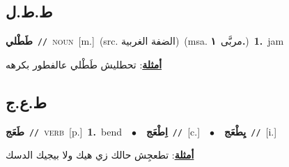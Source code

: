 \documentclass[10pt,a4paper,twoside]{article} %
\begin{document}
\begin{multicols}{2}
\vspace{-3mm}
\subsection*{\color{blue}\foreignlanguage{arabic}{ط.ط.ل}\color{blue}{ (ntws)}} 

{\setlength\topsep{0pt}\textbf{\foreignlanguage{arabic}{طَطْلي}}\ {\color{gray}\texttt{//}\color{black}}\ \textsc{noun}\ [m.]\ (src. \color{gray}\foreignlanguage{arabic}{الضفة الغربية}\color{black})\ \color{gray}(msa. \foreignlanguage{arabic}{مربَّى}~\foreignlanguage{arabic}{\textbf{١.}})\color{black}\ \textbf{1.}~jam\  \begin{flushright}\color{gray}\foreignlanguage{arabic}{\textbf{\underline{\foreignlanguage{arabic}{أمثلة}}}: تحطليش طَطْلي عالفطور بكرهه}\end{flushright}\color{black}} \vspace{2mm}

\vspace{-3mm}
\subsection*{\color{blue}\foreignlanguage{arabic}{ط.ع.ج}\color{blue}{}} 

{\setlength\topsep{0pt}\textbf{\foreignlanguage{arabic}{طَعَج}}\ {\color{gray}\texttt{//}\color{black}}\ \textsc{verb}\ [p.]\ \textbf{1.}~bend\ \ $\bullet$\ \ \setlength\topsep{0pt}\textbf{\foreignlanguage{arabic}{اِطْعَج}}\ {\color{gray}\texttt{//}\color{black}}\ [c.]\ \ $\bullet$\ \ \setlength\topsep{0pt}\textbf{\foreignlanguage{arabic}{يِطْعَج}}\ {\color{gray}\texttt{//}\color{black}}\ [i.]\  \begin{flushright}\color{gray}\foreignlanguage{arabic}{\textbf{\underline{\foreignlanguage{arabic}{أمثلة}}}: تطعجِش حالك زي هيك ولا بيجيك الدسك}\end{flushright}\color{black}} \vspace{2mm}


\end{multicols}
\end{document}
